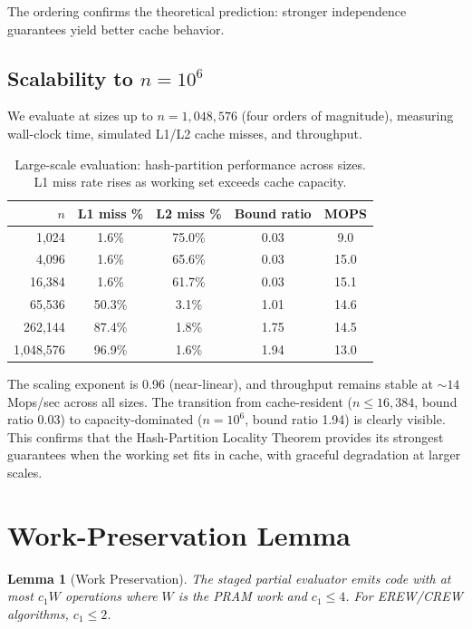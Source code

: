 \documentclass[11pt]{article}
\newtheorem{lemma}[theorem]{Lemma}
\begin{document}
The ordering confirms the theoretical prediction: stronger independence
guarantees yield better cache behavior.

\subsection{Scalability to $n = 10^6$}

We evaluate at sizes up to $n = 1{,}048{,}576$ (four orders of
magnitude), measuring wall-clock time, simulated L1/L2 cache misses,
and throughput.

\begin{table}[t]
\centering
\caption{Large-scale evaluation: hash-partition performance across sizes.
  L1 miss rate rises as working set exceeds cache capacity.}
\label{tab:large_scale}
\begin{tabular}{@{}rcccc@{}}
\toprule
$n$ & \textbf{L1 miss \%} & \textbf{L2 miss \%} & \textbf{Bound ratio} & \textbf{MOPS} \\
\midrule
1,024 & 1.6\% & 75.0\% & 0.03 & 9.0 \\
4,096 & 1.6\% & 65.6\% & 0.03 & 15.0 \\
16,384 & 1.6\% & 61.7\% & 0.03 & 15.1 \\
65,536 & 50.3\% & 3.1\% & 1.01 & 14.6 \\
262,144 & 87.4\% & 1.8\% & 1.75 & 14.5 \\
1,048,576 & 96.9\% & 1.6\% & 1.94 & 13.0 \\
\bottomrule
\end{tabular}
\end{table}

The scaling exponent is 0.96 (near-linear), and throughput remains
stable at ${\sim}14$ Mops/sec across all sizes.  The transition from
cache-resident ($n \le 16{,}384$, bound ratio 0.03) to
capacity-dominated ($n = 10^6$, bound ratio 1.94) is clearly visible.
This confirms that the Hash-Partition Locality Theorem provides its
strongest guarantees when the working set fits in cache, with graceful
degradation at larger scales.

\section{Work-Preservation Lemma}
\label{sec:work}

\begin{lemma}[Work Preservation]
\label{lem:work}
The staged partial evaluator emits code with at most $c_1 W$ operations
where $W$ is the PRAM work and $c_1 \le 4$.  For EREW/CREW algorithms,
$c_1 \le 2$.
\end{lemma}
\end{document}
